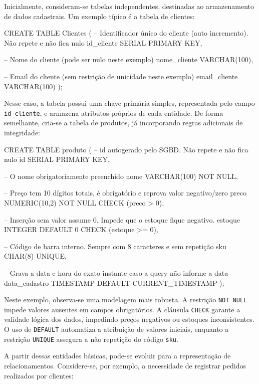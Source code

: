 Inicialmente, consideram-se tabelas independentes, destinadas ao armazenamento de dados cadastrais. Um exemplo típico é a tabela de clientes:

\begin{sqlcode}
CREATE TABLE Clientes (
    -- Identificador único do cliente (auto incremento). Não repete e não fica nulo
    id_cliente SERIAL PRIMARY KEY,

    -- Nome do cliente (pode ser nulo neste exemplo)
    nome_cliente VARCHAR(100),

    -- Email do cliente (sem restrição de unicidade neste exemplo)
    email_cliente VARCHAR(100)
);
\end{sqlcode}

Nesse caso, a tabela possui uma chave primária simples, representada pelo campo \texttt{id\_cliente}, e armazena atributos próprios de cada entidade. De forma semelhante, cria-se a tabela de produtos, já incorporando regras adicionais de integridade:

\begin{sqlcode}
CREATE TABLE produto (
    -- id autogerado pelo SGBD. Não repete e não fica nulo
    id SERIAL PRIMARY KEY,            
    
    -- O nome obrigatoriamente preenchido
    nome VARCHAR(100) NOT NULL,      
    
    -- Preço tem 10 dígitos totais, é obrigatório e reprova valor negativo/zero
    preco NUMERIC(10,2) NOT NULL CHECK (preco > 0),    
    
    -- Inserção sem valor assume 0. Impede que o estoque fique negativo.
    estoque INTEGER DEFAULT 0 CHECK (estoque >= 0),       
    
    -- Código de barra interno. Sempre com 8 caracteres e sem repetição
    sku CHAR(8) UNIQUE,               

    -- Grava a data e hora do exato instante caso a query não informe a data
    data_cadastro TIMESTAMP DEFAULT CURRENT_TIMESTAMP
);
\end{sqlcode}

Neste exemplo, observa-se uma modelagem mais robusta. A restrição \texttt{NOT NULL} impede valores ausentes em campos obrigatórios. A cláusula \texttt{CHECK} garante a validade lógica dos dados, impedindo preços negativos ou estoques inconsistentes. O uso de \texttt{DEFAULT} automatiza a atribuição de valores iniciais, enquanto a restrição \texttt{UNIQUE} assegura a não repetição do código \texttt{sku}.

A partir dessas entidades básicas, pode-se evoluir para a representação de relacionamentos. Considere-se, por exemplo, a necessidade de registrar pedidos realizados por clientes:

